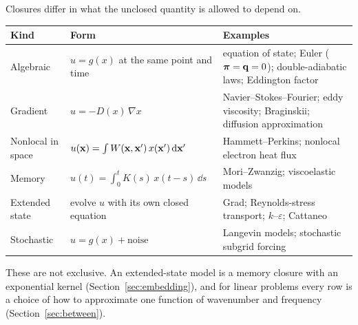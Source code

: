 Closures differ in what the unclosed quantity is allowed to depend on.
\begin{center}
\renewcommand{\arraystretch}{1.25}
\begin{tabularx}{\textwidth}{@{}P{3.3cm}P{5.3cm}Y@{}}
\toprule
Kind & Form & Examples \\
\midrule
Algebraic & $u = g(x)$ at the same point and time
  & equation of state; Euler ($\boldsymbol\pi=\mathbf{q}=0$); double-adiabatic
    laws; Eddington factor \\
Gradient & $u = -D(x)\,\nabla x$
  & Navier--Stokes--Fourier; eddy viscosity; Braginskii; diffusion
    approximation \\
Nonlocal in space & $u(\mathbf{x}) = \int W(\mathbf{x},\mathbf{x}')\,x(\mathbf{x}')\,\mathrm{d}\mathbf{x}'$
  & Hammett--Perkins; nonlocal electron heat flux \\
Memory & $u(t) = \int_0^t K(s)\,x(t-s)\,\dd s$
  & Mori--Zwanzig; viscoelastic models \\
Extended state & evolve $u$ with its own closed equation
  & Grad; Reynolds-stress transport; $k$--$\varepsilon$; Cattaneo \\
Stochastic & $u = g(x) + \text{noise}$
  & Langevin models; stochastic subgrid forcing \\
\bottomrule
\end{tabularx}
\end{center}
These are not exclusive. An extended-state model is a memory closure with an
exponential kernel (Section~\ref{sec:embedding}), and for linear problems
every row is a choice of how to approximate one function of wavenumber and
frequency (Section~\ref{sec:between}).
